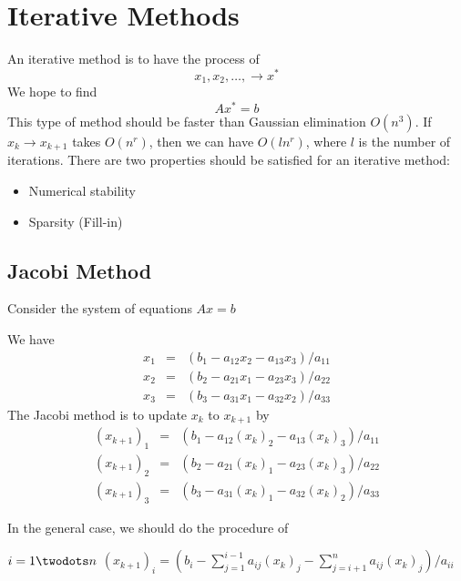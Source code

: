 
\section{Iterative Methods}

An iterative method is to have the process of \[
    x_1, x_2, \ldots, \to x^*
\]
We hope to find \[
    Ax^* = b
\]
This type of method should be faster than Gaussian elimination $O(n^3)$. If $x_k \to x_{k+1}$ takes $O(n^r)$, then we can have $O(ln^r)$, where $l$ is the number of iterations. There are two properties should be satisfied for an iterative method:
\begin{itemize}
    \item Numerical stability
    \item Sparsity (Fill-in)
\end{itemize}

\subsection{Jacobi Method}

\begin{eg}
    Consider the system of equations $Ax = b$
\end{eg}

We have 
\begin{eqnarray*}
x_1 &=& (b_1 - a_{12}x_2 - a_{13}x_3)/a_{11}\\
x_2 &=& (b_2 - a_{21}x_1 - a_{23}x_3)/a_{22}\\
x_3 &=& (b_3 - a_{31}x_1 - a_{32}x_2)/a_{33}
\end{eqnarray*}
The Jacobi method is to update $x_k$ to $x_{k+1}$ by 
\begin{eqnarray*}
(x_{k+1})_1 &=& (b_1 - a_{12}(x_k)_2 - a_{13}(x_k)_3)/a_{11}\\
(x_{k+1})_2 &=& (b_2 - a_{21}(x_k)_1 - a_{23}(x_k)_3)/a_{22}\\
(x_{k+1})_3 &=& (b_3 - a_{31}(x_k)_1 - a_{32}(x_k)_2)/a_{33}
\end{eqnarray*}

In the general case, we should do the procedure of 

\begin{codebox}
\li \For $i = 1 \twodots n$
\Do
\li $(x_{k+1})_i =  ( b_i - \sum_{j=1}^{i-1} a_{ij} (x_k)_j - \sum_{j=i+1}^n a_{ij} (x_k)_j )/ a_{ii}$
\End
\end{codebox}

